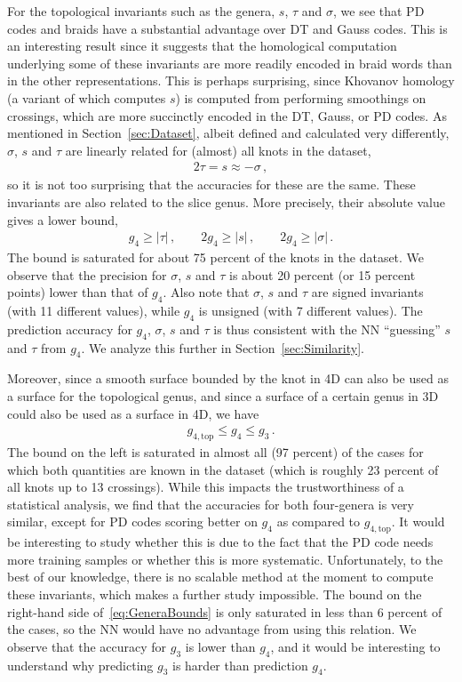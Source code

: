 \documentclass[11pt]{article}
\numberwithin{equation}{section}
\begin{document}
For the topological invariants such as the genera, $s$, $\tau$ and $\sigma$, we see that PD codes and braids have a substantial advantage over DT and Gauss codes. This is an interesting result since it suggests that the homological computation underlying some of these invariants are more readily encoded in braid words than in the other representations. This is perhaps surprising, since Khovanov homology (a variant of which computes $s$) is computed from performing smoothings on crossings, which are more succinctly encoded in the DT, Gauss, or PD codes. As mentioned in Section~\ref{sec:Dataset}, albeit defined and calculated very differently, $\sigma$, $s$ and $\tau$ are linearly related for (almost) all knots in the dataset, 
\begin{align}
    2\tau = s\approx -\sigma\,,
\end{align}
so it is not too surprising that the accuracies for these are the same. These invariants are also related to the slice genus. More precisely, their absolute value gives a lower bound,
\begin{align}
\label{eq:staug4}
g_4 \geq |\tau|\,, \qquad 2 g_4 \geq |s|\,,\qquad 2 g_4 \geq |\sigma|\,. 
\end{align}
The bound is saturated for about 75 percent of the knots in the dataset. We observe that the precision for $\sigma$, $s$ and $\tau$ is about 20 percent (or 15 percent points) lower than that of $g_4$. Also note that $\sigma$, $s$ and $\tau$ are signed invariants (with 11 different values), while $g_4$ is unsigned (with 7 different values). The prediction accuracy for $g_4$, $\sigma$, $s$ and $\tau$ is thus consistent with the NN ``guessing'' $s$ and $\tau$ from $g_4$. We analyze this further in Section~\ref{sec:Similarity}.

Moreover, since a smooth surface bounded by the knot in 4D  can also be used as a surface for the topological genus, and since a surface of a certain genus in 3D could also be used as a surface in 4D, we have
\begin{align}
\label{eq:GeneraBounds}
g_{4,\text{top}} \leq g_4 \leq g_3\,. 
\end{align}
The bound on the left is saturated in almost all (97 percent) of the cases for which both quantities are known in the dataset (which is roughly 23 percent of all knots up to 13 crossings). While this impacts the trustworthiness of a statistical analysis, we find that the accuracies for both four-genera is very similar, except for PD codes scoring better on $g_4$ as compared to $g_{4,\text{top}}$. It would be interesting to study whether this is due to the fact that the PD code needs more training samples or whether this is more systematic. Unfortunately, to the best of our knowledge, there is no scalable method at the moment to compute these invariants, which makes a further study impossible.  The bound on the right-hand side of~\eqref{eq:GeneraBounds} is only saturated in less than 6 percent of the cases, so the NN would have no advantage from using this relation. We observe that the accuracy for $g_3$ is lower than $g_4$, and it would be interesting to understand why predicting $g_3$ is harder than prediction $g_4$.
\end{document}
